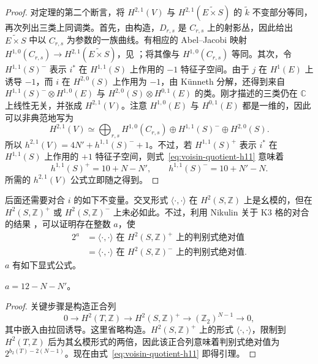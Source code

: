 \begin{proof}
对定理的第二个断言，将 $H^{2,1}(V)$ 与 $H^{2,1}(\widetilde{E\times S})$ 的 $\widetilde k$ 不变部分等同，再次列出三类上同调类。首先，由构造，$D_{r,s}$ 是 $C_{r,s}$ 上的射影丛，因此给出 $\widetilde{E\times S}$ 中以 $C_{r,s}$ 为参数的一族曲线。有相应的 Abel--Jacobi 映射 $H^{1,0}(C_{r,s})\to H^{2,1}(\widetilde{E\times S})$，见 ；将其像与 $H^{1,0}(C_{r,s})$ 等同。其次，令 $H^{1,1}(S)^-$ 表示 $i^*$ 在 $H^{1,1}(S)$ 上作用的 $-1$ 特征子空间。由于 $j$ 在 $H^1(E)$ 上诱导 $-1$，而 $i$ 在 $H^{2,0}(S)$ 上作用为 $-1$，由 Künneth 分解，还得到来自 $H^{1,1}(S)^-\otimes H^{1,0}(E)$ 与 $H^{2,0}(S)\otimes H^{0,1}(E)$ 的类。刚才描述的三类仍在 $\mathbb C$ 上线性无关，并张成 $H^{2,1}(V)$。注意 $H^{1,0}(E)$ 与 $H^{0,1}(E)$ 都是一维的，因此可以非典范地写为
\begin{equation}\label{eq:voisin-h21-decomposition}
H^{2,1}(V)\simeq\bigoplus_{r,s}H^{1,0}(C_{r,s})
\oplus H^{1,1}(S)^-\oplus H^{2,0}(S).
\end{equation}
所以 $h^{2,1}(V)=4N'+h^{1,1}(S)^-+1$。不过，若 $H^{1,1}(S)^+$ 表示 $i^*$ 在 $H^{1,1}(S)$ 上作用的 $+1$ 特征子空间，则式~\eqref{eq:voisin-quotient-h11} 意味着
\begin{equation}\label{eq:voisin-eigenspace-h11}
h^{1,1}(S)^+=10+N-N',\qquad
h^{1,1}(S)^-=10+N'-N.
\end{equation}
所需的 $h^{2,1}(V)$ 公式立即随之得到。
\end{proof}

后面还需要对合 $i$ 的如下不变量。交叉形式 $\langle\cdot,\cdot\rangle$ 在 $H^2(S,\mathbb Z)$ 上是幺模的，但在 $H^2(S,\mathbb Z)^+$ 或 $H^2(S,\mathbb Z)^-$ 上未必如此。不过，利用 Nikulin 关于 K3 格的对合的结果 ，可以证明存在整数 $a$，使
\begin{equation}\label{eq:voisin-discriminant}
\begin{aligned}
2^a&=\langle\cdot,\cdot\rangle\text{ 在 }H^2(S,\mathbb Z)^+
\text{ 上的判别式绝对值}\\
&=\langle\cdot,\cdot\rangle\text{ 在 }H^2(S,\mathbb Z)^-
\text{ 上的判别式绝对值}.
\end{aligned}
\end{equation}
$a$ 有如下显式公式。
\begin{lemma}\label{lem:voisin-discriminant}
$a=12-N-N'$。
\end{lemma}
\begin{proof}
关键步骤是构造正合列
\[
0\longrightarrow H^2(T,\mathbb Z)
\longrightarrow H^2(S,\mathbb Z)^+
\longrightarrow(\mathbb Z_2)^{N-1}\longrightarrow0,
\]
其中嵌入由拉回诱导。这里省略构造。$H^2(S,\mathbb Z)^+$ 上的形式 $\langle\cdot,\cdot\rangle$，限制到 $H^2(T,\mathbb Z)$ 后为其幺模形式的两倍，因此该正合列意味着判别式绝对值为 $2^{b_2(T)-2(N-1)}$。现在由式~\eqref{eq:voisin-quotient-h11} 即得引理。
\end{proof}

